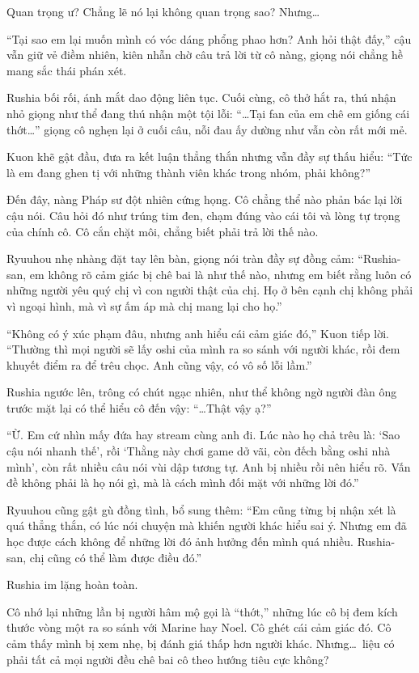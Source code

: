 \documentclass[../main.tex]{subfiles}
\begin{document}
Quan trọng ư? Chẳng lẽ nó lại không quan trọng sao? Nhưng\dots

``Tại sao em lại muốn mình có vóc dáng phổng phao hơn? Anh hỏi thật đấy,'' cậu vẫn giữ vẻ điềm nhiên, kiên nhẫn chờ câu trả lời từ cô nàng, giọng nói chẳng hề mang sắc thái phán xét.

Rushia bối rối, ánh mắt dao động liên tục. Cuối cùng, cô thở hắt ra, thú nhận nhỏ giọng như thể đang thú nhận một tội lỗi: ``\dots Tại fan của em chê em giống cái thớt\dots'' giọng cô nghẹn lại ở cuối câu, nỗi đau ấy dường như vẫn còn rất mới mẻ.

Kuon khẽ gật đầu, đưa ra kết luận thẳng thắn nhưng vẫn đầy sự thấu hiểu: ``Tức là em đang ghen tị với những thành viên khác trong nhóm, phải không?''

Đến đây, nàng Pháp sư đột nhiên cứng họng. Cô chẳng thể nào phản bác lại lời cậu nói. Câu hỏi đó như trúng tim đen, chạm đúng vào cái tôi và lòng tự trọng của chính cô. Cô cắn chặt môi, chẳng biết phải trả lời thế nào.

Ryuuhou nhẹ nhàng đặt tay lên bàn, giọng nói tràn đầy sự đồng cảm: ``Rushia-san, em không rõ cảm giác bị chê bai là như thế nào, nhưng em biết rằng luôn có những người yêu quý chị vì con người thật của chị. Họ ở bên cạnh chị không phải vì ngoại hình, mà vì sự ấm áp mà chị mang lại cho họ.''

``Không có ý xúc phạm đâu, nhưng anh hiểu cái cảm giác đó,'' Kuon tiếp lời. ``Thường thì mọi người sẽ lấy oshi của mình ra so sánh với người khác, rồi đem khuyết điểm ra để trêu chọc. Anh cũng vậy, có vô số lỗi lầm.''

Rushia ngước lên, trông có chút ngạc nhiên, như thể không ngờ người đàn ông trước mặt lại có thể hiểu cô đến vậy: ``\dots Thật vậy ạ?''

``Ừ. Em cứ nhìn mấy đứa hay stream cùng anh đi. Lúc nào họ chả trêu là: `Sao cậu nói nhanh thế', rồi `Thằng này chơi game dở vãi, còn đếch bằng oshi nhà mình', còn rất nhiều câu nói vùi dập tương tự. Anh bị nhiều rồi nên hiểu rõ. Vấn đề không phải là họ nói gì, mà là cách mình đối mặt với những lời đó.''

Ryuuhou cũng gật gù đồng tình, bổ sung thêm: ``Em cũng từng bị nhận xét là quá thẳng thắn, có lúc nói chuyện mà khiến người khác hiểu sai ý. Nhưng em đã học được cách không để những lời đó ảnh hưởng đến mình quá nhiều. Rushia-san, chị cũng có thể làm được điều đó.''

Rushia im lặng hoàn toàn.

Cô nhớ lại những lần bị người hâm mộ gọi là ``thớt,'' những lúc cô bị đem kích thước vòng một ra so sánh với Marine hay Noel. Cô ghét cái cảm giác đó. Cô cảm thấy mình bị xem nhẹ, bị đánh giá thấp hơn người khác. Nhưng\dots\ liệu có phải tất cả mọi người đều chê bai cô theo hướng tiêu cực không?
\end{document}
